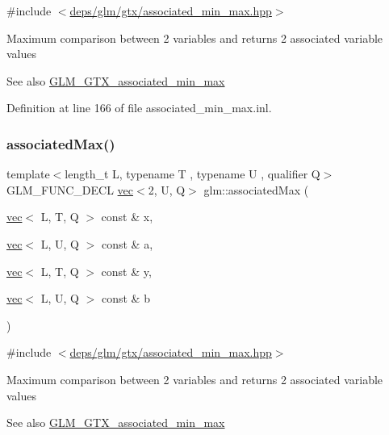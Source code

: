 {\ttfamily \#include $<$\hyperlink{associated__min__max_8hpp}{deps/glm/gtx/associated\+\_\+min\+\_\+max.\+hpp}$>$}

Maximum comparison between 2 variables and returns 2 associated variable values \begin{DoxySeeAlso}{See also}
\hyperlink{group__gtx__associated__min__max}{G\+L\+M\+\_\+\+G\+T\+X\+\_\+associated\+\_\+min\+\_\+max} 
\end{DoxySeeAlso}


Definition at line 166 of file associated\+\_\+min\+\_\+max.\+inl.

\mbox{\label{group__gtx__associated__min__max_ga5c6758bc50aa7fbe700f87123a045aad}} 
\subsubsection{\texorpdfstring{associated\+Max()}{associatedMax()}\hspace{0.1cm}{\footnotesize\ttfamily [2/12]}}
{\footnotesize\ttfamily template$<$length\+\_\+t L, typename T , typename U , qualifier Q$>$ \\
G\+L\+M\+\_\+\+F\+U\+N\+C\+\_\+\+D\+E\+CL \hyperlink{structglm_1_1vec}{vec}$<$2, U, Q$>$ glm\+::associated\+Max (\begin{DoxyParamCaption}\item[{\hyperlink{structglm_1_1vec}{vec}$<$ L, T, Q $>$ const \&}]{x,  }\item[{\hyperlink{structglm_1_1vec}{vec}$<$ L, U, Q $>$ const \&}]{a,  }\item[{\hyperlink{structglm_1_1vec}{vec}$<$ L, T, Q $>$ const \&}]{y,  }\item[{\hyperlink{structglm_1_1vec}{vec}$<$ L, U, Q $>$ const \&}]{b }\end{DoxyParamCaption})}



{\ttfamily \#include $<$\hyperlink{associated__min__max_8hpp}{deps/glm/gtx/associated\+\_\+min\+\_\+max.\+hpp}$>$}

Maximum comparison between 2 variables and returns 2 associated variable values \begin{DoxySeeAlso}{See also}
\hyperlink{group__gtx__associated__min__max}{G\+L\+M\+\_\+\+G\+T\+X\+\_\+associated\+\_\+min\+\_\+max} 
\end{DoxySeeAlso}



